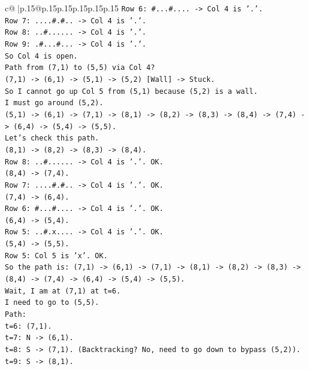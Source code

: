 \documentclass{article}
\begin{document}
{\begin{supertabular}{c@{$\;$}|p{.15\linewidth}@{}p{.15\linewidth}p{.15\linewidth}p{.15\linewidth}p{.15\linewidth}p{.15\linewidth}}
{{{\texttt{Row 6: \#...\#.... {-}> Col 4 is '.'.} \\
\texttt{Row 7: ....\#.\#.. {-}> Col 4 is '.'.} \\
\texttt{Row 8: ..\#...... {-}> Col 4 is '.'.} \\
\texttt{Row 9: .\#...\#... {-}> Col 4 is '.'.} \\
\texttt{So Col 4 is open.} \\
\texttt{Path from (7,1) to (5,5) via Col 4?} \\
\texttt{(7,1) {-}> (6,1) {-}> (5,1) {-}> (5,2) {[}Wall{]} {-}> Stuck.} \\
\texttt{So I cannot go up Col 5 from (5,1) because (5,2) is a wall.} \\
\texttt{I must go around (5,2).} \\
\texttt{(5,1) {-}> (6,1) {-}> (7,1) {-}> (8,1) {-}> (8,2) {-}> (8,3) {-}> (8,4) {-}> (7,4) {-}> (6,4) {-}> (5,4) {-}> (5,5).} \\
\texttt{Let's check this path.} \\
\texttt{(8,1) {-}> (8,2) {-}> (8,3) {-}> (8,4).} \\
\texttt{Row 8: ..\#...... {-}> Col 4 is '.'. OK.} \\
\texttt{(8,4) {-}> (7,4).} \\
\texttt{Row 7: ....\#.\#.. {-}> Col 4 is '.'. OK.} \\
\texttt{(7,4) {-}> (6,4).} \\
\texttt{Row 6: \#...\#.... {-}> Col 4 is '.'. OK.} \\
\texttt{(6,4) {-}> (5,4).} \\
\texttt{Row 5: ..\#.x.... {-}> Col 4 is '.'. OK.} \\
\texttt{(5,4) {-}> (5,5).} \\
\texttt{Row 5: Col 5 is 'x'. OK.} \\
\texttt{So the path is: (7,1) {-}> (6,1) {-}> (7,1) {-}> (8,1) {-}> (8,2) {-}> (8,3) {-}> (8,4) {-}> (7,4) {-}> (6,4) {-}> (5,4) {-}> (5,5).} \\
\texttt{Wait, I am at (7,1) at t=6.} \\
\texttt{I need to go to (5,5).} \\
\texttt{Path:} \\
\texttt{t=6: (7,1).} \\
\texttt{t=7: N {-}> (6,1).} \\
\texttt{t=8: S {-}> (7,1). (Backtracking? No, need to go down to bypass (5,2)).} \\
\texttt{t=9: S {-}> (8,1).} \\
}}}
\end{supertabular}}
\end{document}
